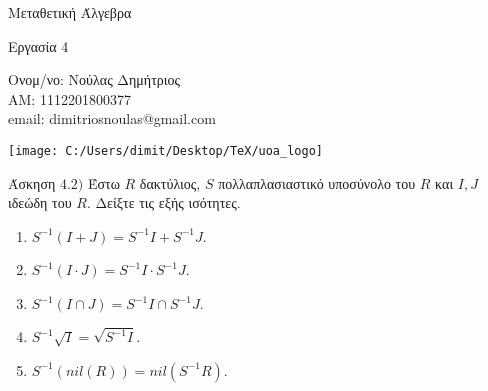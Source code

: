 \documentclass[oneside,a4paper]{article}
\newcommand {\tl}{\textlatin}
\begin{document}
	
	
	\begin{framed}	
		\begin{center}
			\huge Μεταθετική Άλγεβρα
		\end{center}
		\begin{center}
			\huge Εργασία 4
		\end{center}
		\vspace{0.3truecm}
		\begin{center}
			Ονομ/νο: Νούλας Δημήτριος\\
			ΑΜ: 1112201800377\\
			\tl{email}: \tl{dimitriosnoulas@gmail.com}
		\end{center}
		\vspace{0.3truecm}
	\end{framed}
	\vspace*{\fill}
	\begin{center}
	\texttt{[image: C:/Users/dimit/Desktop/TeX/uoa\_logo]}
	\end{center}
\vspace{1cm}
\pagebreak


\noindent Άσκηση $4.2)$
\quad Έστω $R$ δακτύλιος, $S$ πολλαπλασιαστικό υποσύνολο του $R$ και $I,J$ ιδεώδη του $R$. Δείξτε τις εξής ισότητες.
	\begin{enumerate}
		\item	$S^{-1}(I+J)=S^{-1}I +S^{-1}J$.
		\item $S^{-1}(I \cdot J)=S^{-1}I \cdot S^{-1}J$.
		
		\item	$S^{-1}(I \cap J)=S^{-1}I \cap S^{-1}J.$
		\item	$S^{-1}\sqrt{I} = \sqrt{S^{-1}I}$.
		\item 	$S^{-1}(nil(R))=nil(S^{-1}R)$.
	\end{enumerate}
\end{document}
